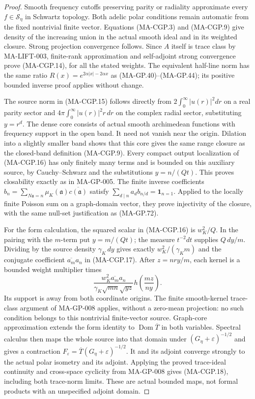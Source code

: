 \begin{proof}
Smooth frequency cutoffs preserving parity or radiality
approximate every $f\in\mathscr S_\eta$ in Schwartz topology.
Both adelic polar conditions remain automatic from the fixed
nontrivial finite vector.  Equations (MA-CGP.3) and (MA-CGP.9)
give density of the increasing union in the actual smooth
ideal and in its weighted closure.  Strong projection convergence
follows.  Since $A$ itself is trace class by MA-LIFT-003,
finite-rank approximation and self-adjoint strong convergence
prove (MA-CGP.14), for all the stated weights.
The equivalent half-line norm has the same ratio
$R(x)=e^{2\alpha|x|-2\alpha x}$ as (MA-GP.40)--(MA-GP.44);
its positive bounded inverse proof applies without change.

The source norm in (MA-CGP.15) follows directly from
$2\int_0^\infty|u(r)|^2dr$ on a real parity sector and
$4\pi\int_0^\infty|u(r)|^2r\,dr$ on the complex radial
sector, substituting $y=r^d$.
The dense core consists of actual smooth archimedean functions
with frequency support in the open band.  It need not vanish
near the origin.  Dilation into a slightly smaller band
shows that this core gives the same range closure as the
closed-band definition (MA-CGP.9).
Every compact output localization of (MA-CGP.16) has only
finitely many terms and is bounded on this auxiliary source,
by Cauchy--Schwarz and the substitutions $y=n/(Qt)$.
This proves closability exactly as in MA-GP-005.
The finite inverse coefficients
$b_n=\sum_{N\mathfrak a=n}\mu_K(\mathfrak a)
                              \overline{c(\mathfrak a)}$
satisfy $\sum_{d\mid n}a_db_{n/d}=\mathbf1_{n=1}$.
Applied to the locally finite Poisson sum on a graph-domain
vector, they prove injectivity of the closure, with the same
null-set justification as (MA-GP.72).

For the form calculation, the squared scalar in (MA-CGP.16)
is $w_K^2/Q$.  In the pairing with the $m$-term put
$y=m/(Qt)$; the measure $t^{-2}dt$ supplies $Q\,dy/m$.
Dividing by the source density $\gamma_K\,dy$ gives
exactly $w_K^2/(\gamma_K m)$ and the conjugate coefficient
$\overline{a_m}a_n$ in (MA-CGP.17).
After $z=nry/m$, each kernel is a bounded weight multiplier
times
\[
       \frac{w_K^2\overline{a_m}a_n}
                    {\gamma_K\sqrt{mn}\sqrt{yz}}
                              h\!\left(\frac{mz}{ny}\right).
 \tag{MA-CGP.19}
\]
Its support is away from both coordinate origins.  The finite
smooth-kernel trace-class argument of MA-GP-008 applies,
without a zero-mean projection: no such condition belongs
to this nontrivial finite-vector source.
Graph-core approximation extends the form identity to
$\operatorname{Dom}\overline T$ in both variables.
Spectral calculus then maps the whole source into that domain
under $(G_\eta+\varepsilon)^{-1/2}$ and gives a contraction
$F_\varepsilon=\overline T(G_\eta+\varepsilon)^{-1/2}$.
It and its adjoint converge strongly to the actual polar
isometry and its adjoint.  Applying the proved trace-ideal
continuity and cross-space cyclicity from MA-GP-008 gives
(MA-CGP.18), including both trace-norm limits.  These are
actual bounded maps, not formal products with an unspecified
adjoint domain.
\end{proof}

